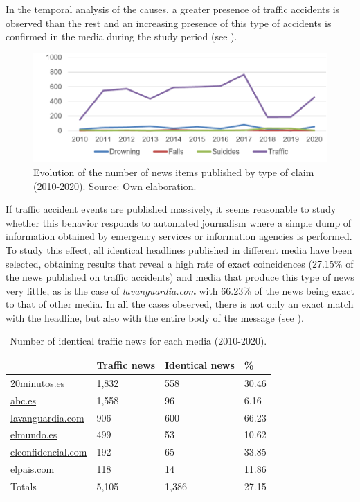 In the temporal analysis of the causes, a greater presence of traffic
accidents is observed than the rest and an increasing presence of this
type of accidents is confirmed in the media during the study period (see
).

\begin{figure}[htpb]
\centering
\begin{minipage}{\textwidth}
\includegraphics[width=\textwidth]{image1.pdf}
\caption{Evolution of the number of news items published by type of claim (2010-2020). Source: Own elaboration.}
\label{fig-01}
\end{minipage}
\end{figure}

If traffic accident events are published massively, it seems reasonable
to study whether this behavior responds to automated journalism where a
simple dump of information obtained by emergency services or information
agencies is performed. To study this effect, all identical headlines
published in different media have been selected, obtaining results that
reveal a high rate of exact coincidences (27.15\% of the news published
on traffic accidents) and media that produce this type of news very
little, as is the case of \emph{lavanguardia.com} with 66.23\% of the
news being exact to that of other media. In all the cases observed,
there is not only an exact match with the headline, but also with the
entire body of the message (see ).

\begin{table}[!htpb]
\centering
\begin{threeparttable}
\caption{Number of identical traffic news for each media (2010-2020).}
\label{tab-02}
\begin{tabular}{*{4}{l}}
\toprule
 & Traffic news & Identical news & \% \\
\midrule
\url{20minutos.es} & 1,832 & 558 & 30.46 \\
\url{abc.es} & 1,558 & 96 & 6.16 \\
\url{lavanguardia.com} & 906 & 600 & 66.23 \\
\url{elmundo.es} & 499 & 53 & 10.62 \\
\url{elconfidencial.com} & 192 & 65 & 33.85 \\
\url{elpais.com} & 118 & 14 & 11.86 \\
Totals & 5,105 & 1,386 & 27.15 \\
\bottomrule
\end{tabular}
\end{threeparttable}
\end{table}

